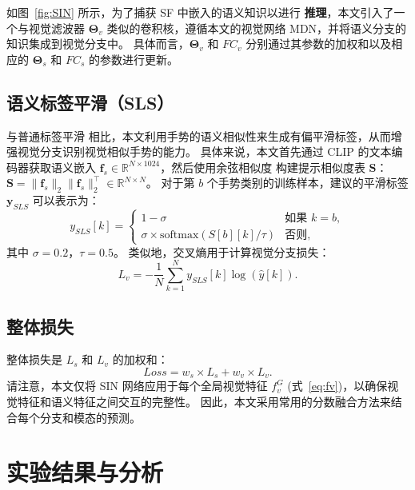 如图~\ref{fig:SIN} 所示，为了捕获 SF 中嵌入的语义知识以进行 \textbf{推理}，本文引入了一个与视觉滤波器 $\boldsymbol{\Theta}_{v}$ 类似的卷积核，遵循本文的视觉网络 MDN，并将语义分支的知识集成到视觉分支中。
具体而言，$\boldsymbol{\Theta}_{v}$ 和 $FC_{v}$ 分别通过其参数的加权和以及相应的 $\boldsymbol{\Theta}_{s}$ 和 $FC_{s}$ 的参数进行更新。

\subsection{语义标签平滑（SLS）}
与普通标签平滑 \cite{he2019bag} 相比，本文利用手势的语义相似性来生成有偏平滑标签，从而增强视觉分支识别视觉相似手势的能力。
具体来说，本文首先通过 CLIP 的文本编码器获取语义嵌入 $\mathbf{f}_{s} \in \mathbb{R}^{N\times 1024}$，然后使用余弦相似度 \cite{zuo2023natural} 构建提示相似度表 $\mathbf{S}$：$\mathbf{S} = \|\mathbf{f}_{s}\|_2\|\mathbf{f}_{s}\|_2^{\top} \in \mathbb{R}^{N\times N}$。
%
对于第 $b$ 个手势类别的训练样本，建议的平滑标签 $\mathbf{y}_{SLS}$ 可以表示为：
\begin{equation}
y_{SLS}[k] = \begin{cases}
1 - \sigma & \text{如果 } k = b,\\
\sigma \times \text{softmax}\left(S[b][k]/\tau\right) & \text{否则},
\end{cases}
\end{equation}
其中 $\sigma=0.2$，$\tau=0.5$。
类似地，交叉熵用于计算视觉分支损失：
\begin{equation}
L_{v} = -\frac{1}{N}\sum_{k=1}^{N}{y_{SLS}[k]\log\left(\hat{y}[k]\right)}. %
\end{equation}

\subsection{整体损失}
整体损失是 $L_{s}$ 和 $L_{v}$ 的加权和：
\begin{equation}
Loss = w_{s} \times L_{s} + w_{v} \times L_{v}.
\label{eq:overall_loss}
\end{equation}
%
请注意，本文仅将 SIN 网络应用于每个全局视觉特征 $f_v^G$ (式~\eqref{eq:fv})，以确保视觉特征和语义特征之间交互的完整性。
因此，本文采用常用的分数融合方法来结合每个分支和模态的预测。

\section{实验结果与分析}
\label{sec:GR_EXP}
